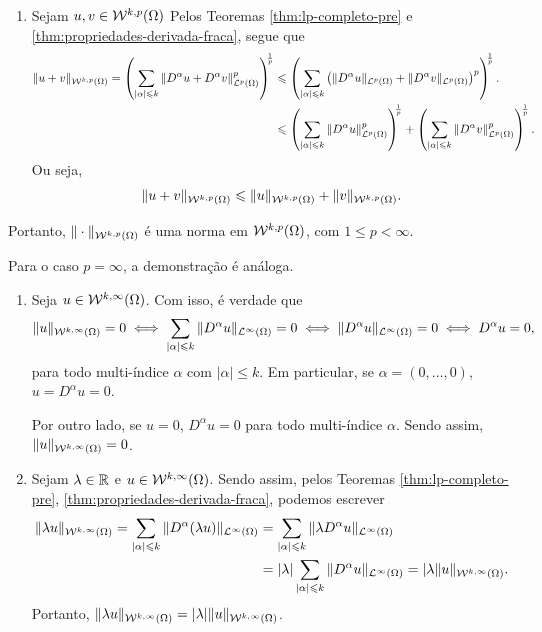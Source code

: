 \begin{prf}
\begin{enumerate}[leftmargin=*]
        \item Sejam $u, v \in \mathcal{W}^{k,p}(\Omega)$ Pelos Teoremas \ref{thm:lp-completo-pre} e \ref{thm:propriedades-derivada-fraca}, segue que
        {\small
        \[
            \begin{aligned}
                \Vert u + v \Vert_{\cW^{k,p}(\Omega)} = \left(\sum_{|\alpha| \leqslant k} \Vert D^\alpha u + D^\alpha v \Vert_{\cL^p(\Omega)}^p\right)^{\!\!\frac{1}{p}} &\leqslant \left(\sum_{|\alpha| \leqslant k} \left(\Vert D^\alpha u \Vert_{\cL^p(\Omega)} + \Vert D^\alpha v \Vert_{\cL^p(\Omega)}\right)^p \right)^{\!\!\frac{1}{p}}.\\
            &\leqslant \left( \sum_{|\alpha| \leqslant k} \Vert D^\alpha u \Vert_{\cL^p(\Omega)}^p \right)^{\!\!\frac{1}{p}} + \left( \sum_{|\alpha| \leqslant k} \Vert D^\alpha v \Vert_{\cL^p(\Omega)}^p \right)^{\!\!\frac{1}{p}}.
            \end{aligned}
        \]}\!
        Ou seja,
        \[
            \Vert u + v \Vert_{\mathcal{W}^{k,p}(\Omega)} \leqslant \Vert u \Vert_{\mathcal{W}^{k,p}(\Omega)} + \Vert v \Vert_{\mathcal{W}^{k,p}(\Omega)}.
        \]
    \end{enumerate}
    Portanto, $\Vert \cdot \Vert_{\mathcal{W}^{k,p}(\Omega)}$ é uma norma em $\mathcal{W}^{k,p}(\Omega)$, com $1 \leqslant p < \infty$.

    Para o caso $p = \infty$, a demonstração é análoga.
    \begin{enumerate}[leftmargin=*]
        \item Seja $u \in \mathcal{W}^{k,\infty}(\Omega)$. Com isso, é verdade que
        \[
            \Vert u \Vert_{\mathcal{W}^{k,\infty}(\Omega)} = 0 \iff \sum_{|\alpha| \leqslant k} \Vert D^\alpha u \Vert_{\mathcal{L}^\infty(\Omega)} = 0 \iff \Vert D^\alpha u \Vert_{\mathcal{L}^\infty(\Omega)} = 0 \iff D^\alpha u = 0,
        \]
        para todo multi-índice $\alpha$ com $|\alpha| \leqslant k$.
        Em particular, se $\alpha = (0,\dots,0)$, $u = D^\alpha u = 0$.

        Por outro lado, se $u = 0$, $D^\alpha u = 0$ para todo multi-índice $\alpha$. Sendo assim, $\Vert u \Vert_{\mathcal{W}^{k,\infty}(\Omega)} = 0$.

        \item Sejam $\lambda \in \mathbb{R}$ e $u \in \mathcal{W}^{k,\infty}(\Omega)$. Sendo assim, pelos Teoremas \ref{thm:lp-completo-pre}, \ref{thm:propriedades-derivada-fraca}, podemos escrever
        \[
            \begin{aligned}
                \Vert \lambda u \Vert_{\mathcal{W}^{k,\infty}(\Omega)} = \sum_{|\alpha| \leqslant k} \Vert D^\alpha (\lambda u) \Vert_{\mathcal{L}^\infty(\Omega)} &= \sum_{|\alpha| \leqslant k} \Vert \lambda D^\alpha u \Vert_{\mathcal{L}^\infty(\Omega)}\\ 
                &= |\lambda|\sum_{|\alpha| \leqslant k} \Vert D^\alpha u \Vert_{\mathcal{L}^\infty(\Omega)} = |\lambda\Vert u \Vert_{\mathcal{W}^{k,\infty}(\Omega)}.
            \end{aligned}
        \]
        Portanto, $\Vert \lambda u \Vert_{\mathcal{W}^{k,\infty}(\Omega)} = |\lambda|\Vert u \Vert_{\mathcal{W}^{k,\infty}(\Omega)}$.


\end{enumerate}
\end{prf}
